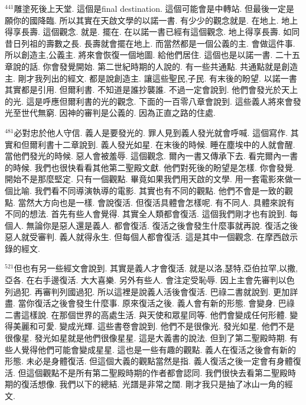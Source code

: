 \documentclass{book}
\begin{document}
$^{441}$雕塗死後上天堂.
這個是final destination.
這個可能會是中轉站.
但最後一定是願你的國降臨.
所以其實在天啟文學的以諾一書.
有少少的觀念就是.
在地上.
地上得享長壽.
這個觀念.
就是.
擺在.
在以諾一書已經有這個觀念.
地上得享長壽.
如同昔日列祖的壽數之長.
長壽就會擺在地上.
而當然都是一個公義的主.
會做這件事.
所以創造主,公義主.
將來會恢復一個地圖.
給他們居住.
這個也是以諾一書.
二十五章說的話.
你會發覺開始.
第二世紀時期的人說的.
有一些共通點.
共通點就是創造主.
剛才我列出的經文.
都是說創造主.
讓這些聖民,子民.
有末後的盼望.
以諾一書其實都是引用.
但爾利書.
不知道是誰抄襲誰.
不過一定會說到.
他們會發光於天上的光.
這是呼應但爾利書的光的觀念.
下面的一百零八章會說到.
這些義人將來會發光至世代無窮.
因神的審判是公義的.
因為正直之路的住處.

$^{481}$必對忠於他人守信.
義人是要發光的.
罪人見到義人發光就會呼喊.
這個寫作.
其實和但爾利書十二章說到.
義人發光如星.
在末後的時候.
睡在塵埃中的人就會醒.
當他們發光的時候.
惡人會被羞辱.
這個觀念.
爾內一書又傳承下去.
看完爾內一書的時候.
我們也很快看看其他第二聖殿文獻.
他們對死後的盼望是怎樣.
你會發覺.
開始不是那麼堅定.
只有一個觀點.
畢竟如果我們用天啟的文學.
用一套電影來做一個比喻.
我們看不同導演執導的電影.
其實也有不同的觀點.
他們不會是一致的觀點.
當然大方向也是一樣.
會說復活.
但復活具體會怎樣呢.
有不同人.
具體來說有不同的想法.
首先有些人會覺得.
其實全人類都會復活.
這個我們剛才也有說到.
每個人.
無論你是惡人還是義人.
都會復活.
復活之後會發生什麼事就再說.
復活之後惡人就受審判.
義人就得永生.
但每個人都會復活.
這是其中一個觀念.
在摩西啟示錄的經文.

$^{521}$但也有另一些經文會說到.
其實是義人才會復活.
就是以洛,瑟特,亞伯拉罕,以撒,亞各.
在右手邊復活.
大大喜樂.
另外有些人.
會注定受恥辱.
因上主會先審判以色列過犯.
再審判列國過犯.
所以這裡是說義人活後會復活.
巴祿二書就說到.
更加詳盡.
當你復活之後會發生什麼事.
原來復活之後.
義人會有新的形態.
會變身.
巴祿二書這樣說.
在那個世界的高處生活.
與天使和眾星同等.
他們會變成任何形體.
變得美麗和可愛.
變成光輝.
這些書卷會說到.
他們不是很像光.
發光如星.
他們不是很像星.
發光如星就是他們很像星星.
這是大義書的說法.
但到了第二聖殿時期.
有些人覺得他們可能會變成星星.
這也是一些有趣的觀點.
義人在復活之後會有新的形態.
未必是身體復活.
但這個大義的觀點當然是指.
義人復活之後一定會有身體復活.
但這個觀點不是所有第二聖殿時期的作者都會認同.
我們很快去看第二聖殿時期的復活想像.
我們以下的總結.
光譜是非常之闊.
剛才我只是抽了冰山一角的經文.
\end{document}
